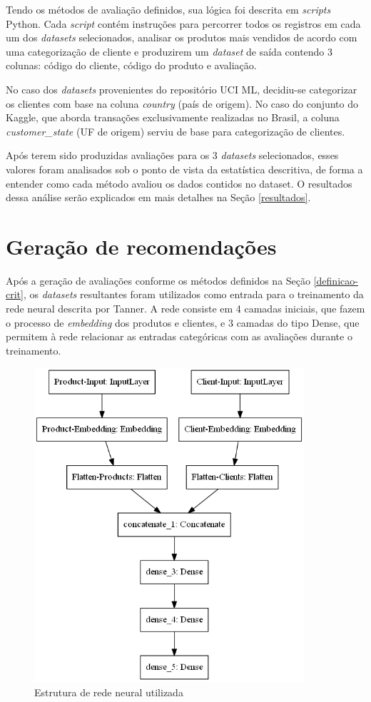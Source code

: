 Tendo os métodos de avaliação definidos, sua lógica foi descrita em \textit{scripts} Python. Cada \textit{script} contém instruções para percorrer todos os registros em cada um dos \textit{datasets} selecionados, analisar os produtos mais vendidos de acordo com uma categorização de cliente e produzirem um \textit{dataset} de saída contendo 3 colunas: código do cliente, código do produto e avaliação.

No caso dos \textit{datasets} provenientes do repositório UCI ML, decidiu-se categorizar os clientes com base na coluna \textit{country} (país de origem). No caso do conjunto do Kaggle, que aborda transações exclusivamente realizadas no Brasil, a coluna \textit{customer\_state} (UF de origem) serviu de base para categorização de clientes.

Após terem sido produzidas avaliações para os 3 \textit{datasets} selecionados, esses valores foram analisados sob o ponto de vista da estatística descritiva, de forma a entender como cada método avaliou os dados contidos no dataset. O resultados dessa análise serão explicados em mais detalhes na Seção \ref{resultados}.

\section{Geração de recomendações} \label{geracao-rec}
Após a geração de avaliações conforme os métodos definidos na Seção \ref{definicao-crit}, os \textit{datasets} resultantes foram utilizados como entrada para o treinamento da rede neural descrita por Tanner. A rede consiste em 4 camadas iniciais, que fazem o processo de \textit{embedding} dos produtos e clientes, e 3 camadas do tipo Dense, que permitem à rede relacionar as entradas categóricas com as avaliações durante o treinamento.

\begin{figure}[htp]
    \centering
    \includegraphics[width=10cm]{doc/latex/text/images/network.png}
    \caption{Estrutura de rede neural utilizada}
    \label{fig:fc-intercateg}
\end{figure}


